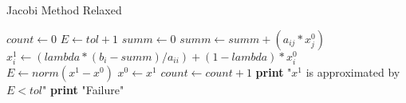 \documentclass{article}
\begin{document}
  \begin{algorithm}
    \caption{Jacobi Method Relaxed}
    \begin{algorithmic}[1]
        \State $count \gets 0$
        \State $E \gets tol + 1$
            \State $summ \gets 0$
                \State $summ \gets summ + (a_{ij} * x_{j}^{0})$
              \EndIf
            \EndFor
            \State $x_{i}^{1} \gets (lambda * (b_{i} - summ) / a_{ii}) + (1 - lambda) * x_{i}^{0}$
          \EndFor
          \State $E \gets norm(x^{1} - x^{0})$
          \State $x^{0} \gets x^{1}$
          \State $count \gets count + 1$
        \EndWhile
          \State \textbf{print} "$x^{1}$ is approximated by $E < tol$"
        \Else
            \State \textbf{print} "Failure"
        \EndIf
      \EndProcedure
    \end{algorithmic}
  \end{algorithm}
\end{document}
